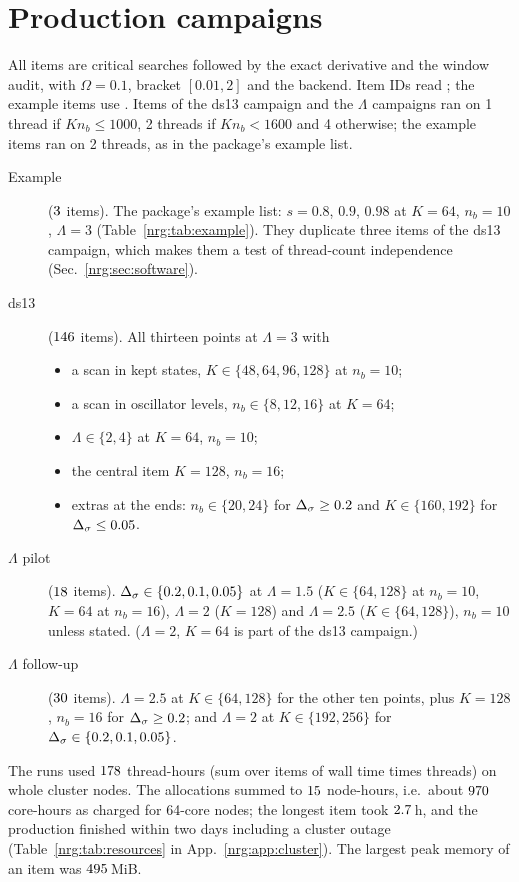 \section{Production campaigns}\label{nrg:sec:campaigns}
All items are critical searches followed by the exact derivative and the window audit, with $\Omega=0.1$, bracket $[0.01,2]$ and
the  backend. Item IDs read ; the example items use
. Items of the ds13 campaign and the $\Lambda$ campaigns ran on 1 thread if
$Kn_b\le1000$, 2 threads if $Kn_b<1600$ and 4 otherwise; the example items ran on 2 threads, as in the package's example list.
\begin{description}
\item[Example] ($3$ items). The package's example list: $s=0.8$, $0.9$, $0.98$ at $K=64$, $n_b=10$, $\Lambda=3$
  (Table~\ref{nrg:tab:example}). They duplicate three items of the ds13 campaign, which makes them a test of thread-count
  independence (Sec.~\ref{nrg:sec:software}).
\item[ds13] ($146$ items). All thirteen points at $\Lambda=3$ with
  \begin{itemize}
  \item a scan in kept states, $K\in\{48,64,96,128\}$ at $n_b=10$;
  \item a scan in oscillator levels, $n_b\in\{8,12,16\}$ at $K=64$;
  \item $\Lambda\in\{2,4\}$ at $K=64$, $n_b=10$;
  \item the central item $K=128$, $n_b=16$;
  \item extras at the ends: $n_b\in\{20,24\}$ for $\Delta_\sigma\ge0.2$ and $K\in\{160,192\}$ for $\Delta_\sigma\le0.05$.
  \end{itemize}
\item[$\Lambda$ pilot] ($18$ items). $\Delta_\sigma\in\{0.2,0.1,0.05\}$ at $\Lambda=1.5$ ($K\in\{64,128\}$ at $n_b=10$, $K=64$ at
  $n_b=16$), $\Lambda=2$ ($K=128$) and $\Lambda=2.5$ ($K\in\{64,128\}$), $n_b=10$ unless stated. ($\Lambda=2$, $K=64$ is part of the
  ds13 campaign.)
\item[$\Lambda$ follow-up] ($30$ items). $\Lambda=2.5$ at $K\in\{64,128\}$ for the other ten points, plus $K=128$,
  $n_b=16$ for $\Delta_\sigma\ge0.2$; and $\Lambda=2$ at $K\in\{192,256\}$ for $\Delta_\sigma\in\{0.2,0.1,0.05\}$.
\end{description}
The runs used $178$ thread-hours (sum over items of wall time times threads) on whole cluster nodes. The allocations
summed to $15$ node-hours, i.e.\ about $970$ core-hours as charged for 64-core nodes; the longest item
took $2.7$\,h, and the production finished within two days including a cluster outage (Table~\ref{nrg:tab:resources} in
App.~\ref{nrg:app:cluster}). The largest peak memory of an item was $495$\,MiB.

